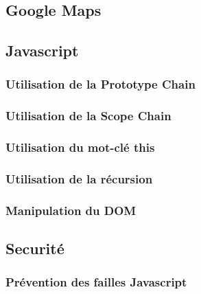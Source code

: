 \documentclass[a4paper]{article}
\begin{document}
	\subsection{Google Maps}
	\subsection{Javascript} 
		\subsubsection{Utilisation de la Prototype Chain}
		\subsubsection{Utilisation de la Scope Chain}
		\subsubsection{Utilisation du mot-clé this}
		\subsubsection{Utilisation de la récursion}
		\subsubsection{Manipulation du DOM}
   \subsection{Securité} 
  		\subsubsection{Prévention des failles Javascript}
\end{document}
